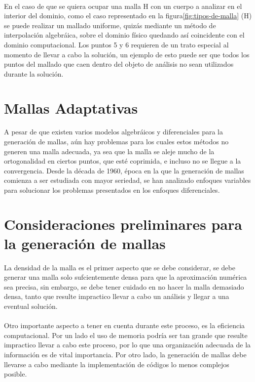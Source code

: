 \documentclass[letterpaper, openright, 12pt]{book}
\begin{document}
    \paragraph*{}
    En el caso de que se quiera ocupar una malla H con un cuerpo a analizar
    en el interior del dominio, como el caso representado en la
    figura\ref*{fig:tipos-de-malla} (H) se puede realizar un mallado uniforme,
    quizás mediante un método de interpolación algebráica, sobre el dominio
    físico quedando así coincidente con el dominio computacional. Los puntos
    5 y 6 requieren de un trato especial al momento de llevar a cabo la
    solución, un ejemplo de esto puede ser que todos los puntos del mallado que
    caen dentro del objeto de análisis no sean utilizados durante la solución.

    \section{Mallas Adaptativas}
    \paragraph*{}
    A pesar de que existen varios modelos algebráicos y diferenciales para
    la generación de mallas, aún hay problemas para los cuales estos métodos
    no generen una malla adecuada, ya sea que la malla se aleje mucho de la
    ortogonalidad en ciertos puntos, que esté coprimida, e incluso no se
    llegue a la convergencia. Desde la década de 1960, época en la que la
    generación de mallas comienza a ser estudiada con mayor seriedad, se han
    analizado enfoques variables para solucionar los problemas presentados
    en los enfoques diferenciales.

    \section{Consideraciones preliminares para la generación de mallas}
    \paragraph*{}
    La densidad de la malla es el primer aspecto que se debe considerar, se
    debe generar una malla solo sufcientemente densa para que la
    aproximación numérica sea precisa, sin embargo, se debe tener cuidado en
    no hacer la malla demasiado densa, tanto que resulte impractico llevar a
    cabo un análisis y llegar a una eventual solución.

    \paragraph*{}
    Otro importante aspecto a tener en cuenta durante este proceso, es la
    eficiencia computacional. Por un lado el uso de memoria podría ser tan
    grande que resulte impractico llevar a cabo este proceso, por lo que una
    organización adecuada de la información es de vital importancia. Por
    otro lado, la generación de mallas debe llevarse a cabo mediante la
    implementación de códigos lo menos complejos posible.
\end{document}
